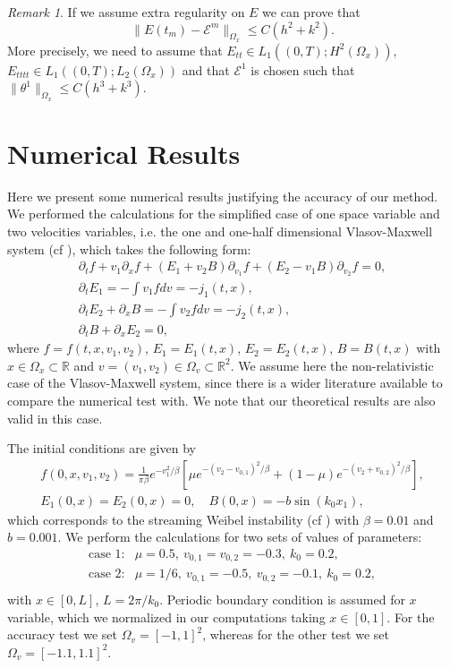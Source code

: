 \documentclass[reqno,a4paper]{amsart}
\theoremstyle{remark}
\newtheorem{remark}[theorem]{Remark}
\numberwithin{equation}{section}
\newcommand{\norm}[1]{\|#1\|}
\def\d{\partial}
\def\R{{\mathbb R}}
\def\EE{\mathcal{E}}
\begin{document}
\begin{remark}
If we assume extra regularity on $ E $ we can prove that
\[
\norm{E(t_m) - \EE^m}_{\Omega_x} \leq C(h^2 + k^2).
\]
More precisely, we need to assume that
$ E_{tt} \in L_1\left((0,T); H^2 ( \Omega_x)\right) $, 
$ E_{tttt} \in L_1 \left((0,T); L_2(\Omega_x)\right) $ 
and that $ \EE^1 $ is chosen such that $ \norm{\theta^1}_{\Omega_x} \leq C(h^3 + k^3) $.
\end{remark}



\section{Numerical Results}

Here we present some numerical results justifying the accuracy of our method.
We performed the calculations for the simplified case of one space variable
and two velocities variables, i.e. the one and one-half dimensional
Vlasov-Maxwell system (cf \cite{Standar:2016}), which takes the following form:
\[
\begin{array}{c}
\d_t f + v_1 \d_x f + (E_1 + v_2 B)\d_{v_1} f + (E_2-v_1 B)\d_{v_2} f=0, \\
\d_t E_1 = - \int v_1 f dv= -j_1(t,x), \\
\d_t E_2 +\d_x B = -\int v_2 f dv=-j_2(t,x), \\
\d_t B + \d_x E_2 =0,
\end{array}
\]
where $f=f(t,x,v_1,v_2)$, $E_1=E_1(t,x)$, $E_2=E_2(t,x)$, $ B=B(t,x)$
with $x\in\Omega_x\subset\R$ and $v=(v_1,v_2)\in\Omega_v\subset\R^2$.
We assume here the non-relativistic case of the Vlasov-Maxwell system,
since there is a wider literature available to compare the numerical test with.
We note that our theoretical results are also valid in this case.

The initial conditions are given by
\[
\begin{array}{c}
f(0,x,v_1,v_2) = \frac{1}{\pi\beta}e^{-v_1^2/\beta}
\left[\mu e^{-(v_2-v_{0,1})^2/\beta}+(1-\mu)e^{-(v_2+v_{0,2})^2/\beta}\right], \\
E_1(0,x) = E_2(0,x) = 0, \quad B(0,x) = -b\sin(k_0x_1),
\end{array}
\]
which corresponds to the streaming Weibel instability (cf \cite{Che})
with $\beta = 0.01$ and $b=0.001$.
We perform the calculations for two sets of values of parameters:
\[
\begin{array}{ll}
\mbox{case 1:} & \mu=0.5,\ v_{0,1}=v_{0,2}=-0.3,\ k_0=0.2,\\
\mbox{case 2:} & \mu=1/6,\ v_{0,1}=-0.5,\ v_{0,2}=-0.1,\ k_0=0.2,\\
\end{array}
\]
with $x\in[0,L]$, $L=2\pi/k_0$.
Periodic boundary condition is assumed for $x$ variable, which
we normalized in our computations taking $x\in[0,1]$.
For the accuracy test we set $\Omega_v=[-1,1]^2$,
whereas for the other test we set $\Omega_v=[-1.1,1.1]^2$.
\end{document}
